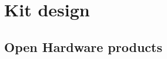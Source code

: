 \documentclass[compress,red]{beamer}
\begin{document}

\section{Kit design}

\subsection{Open Hardware products}
\end{document}
